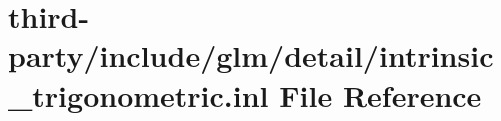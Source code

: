 \hypertarget{intrinsic__trigonometric_8inl}{}\section{third-\/party/include/glm/detail/intrinsic\+\_\+trigonometric.inl File Reference}
\label{intrinsic__trigonometric_8inl}
